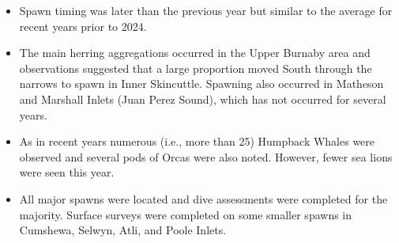\begin{itemize}

\item Spawn timing was later than the previous year but
similar to the average for recent years prior to 2024.

\item The main herring aggregations occurred in the Upper Burnaby area and
observations suggested that a large proportion moved
South through the narrows to spawn in Inner Skincuttle.
Spawning also occurred in Matheson and Marshall Inlets (Juan Perez Sound),
which has not occurred for several years.

\item As in recent years numerous (i.e., more than 25) Humpback Whales
were observed and several pods of Orcas were also noted.
However, fewer sea lions were seen this year.

\item All major spawns were located and
dive assessments were completed for the majority.
Surface surveys were completed on some smaller
spawns in Cumshewa, Selwyn, Atli, and Poole Inlets.

\end{itemize}